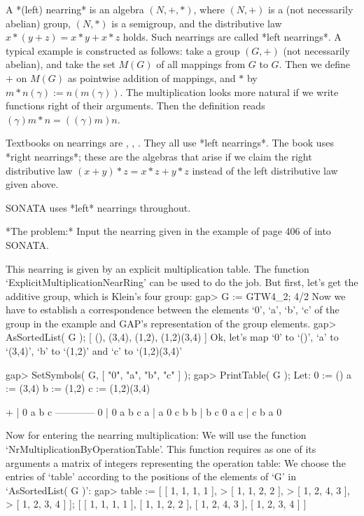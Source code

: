 %
%

A *(left) nearring* is an algebra $(N,+,*)$, where
$(N,+)$ is a (not necessarily abelian) group,
$(N,*)$ is a semigroup, and 
the distributive law $x*(y+z) = x*y+x*z$ 
holds.
Such nearrings are called *left nearrings*.
A typical example is constructed as follows:
take a group $(G,+)$ (not necessarily abelian), and
take the set $M(G)$ of all mappings from $G$ to $G$.
Then we define $+$ on $M(G)$ as pointwise addition of
mappings, and $*$ by $m * n (\gamma) := n (m (\gamma))$.
The multiplication looks more natural if we write
functions right of their arguments. Then the definition
reads $(\gamma) m * n = ((\gamma)m)n$.

Textbooks on nearrings are \cite{meldrum85:NATLWG}, \cite{Clay:Nearrings},
\cite{Ferrero:Nearrings}. They all use *left nearrings*.
The book \cite{Pilz:Nearrings} uses *right nearrings*; these are 
the algebras that arise if we claim the right distributive law
 $(x + y) * z = x*z + y*z$ instead of the left distributive law
given above. 

SONATA uses *left* nearrings throughout.
     


*The problem:* Input the nearring given in the example
of page 406 of \cite{Pilz:Nearrings}
into SONATA.

This nearring is given by an explicit multiplication table.
The function `ExplicitMultiplicationNearRing' can be 
used to do the job.
But first, let's get the additive group, which is
Klein's four group:
\beginexample
    gap> G := GTW4_2;
    4/2
\endexample
Now we have to establish a correspondence between
the elements `0', `a', `b', `c' of the group in the example
and GAP's representation of the group elements.
\beginexample
    gap> AsSortedList( G );
    [ (), (3,4), (1,2), (1,2)(3,4) ]
\endexample
Ok, let's map `0' to `()', `a' to `(3,4)', `b' to `(1,2)'
and `c' to `(1,2)(3,4)'

\beginexample
    gap> SetSymbols( G, [ "0", "a", "b", "c" ] );
    gap> PrintTable( G );
    Let:
    0 := ()
    a := (3,4)
    b := (1,2)
    c := (1,2)(3,4)

      +  | 0 a b c     
      ------------    
      0  | 0 a b c     
      a  | a 0 c b     
      b  | b c 0 a     
      c  | c b a 0     

\endexample

Now for entering the nearring multiplication:
We will use the function `NrMultiplicationByOperationTable'.
This function requires as one of its arguments a matrix
of integers representing the operation table:
We choose the entries of `table' according to the
positions of the elements of `G' in
`AsSortedList( G )':
\beginexample
    gap> table := [ [ 1, 1, 1, 1 ],                 
    >               [ 1, 1, 2, 2 ],
    >               [ 1, 2, 4, 3 ],
    >               [ 1, 2, 3, 4 ] ];
    [ [ 1, 1, 1, 1 ], [ 1, 1, 2, 2 ], [ 1, 2, 4, 3 ], [ 1, 2, 3, 4 ] ]
\endexample


